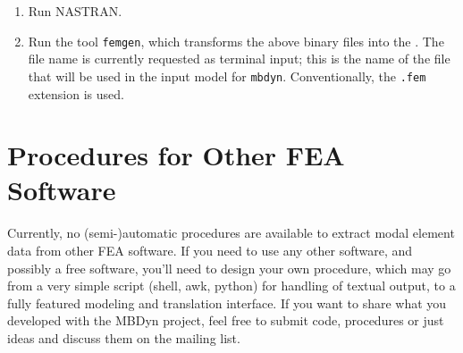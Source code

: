 \begin{enumerate}
\item Run NASTRAN.


\item Run the tool \texttt{femgen}, which transforms the above binary files
into the .
The file name is currently requested as terminal input; this is the name 
of the file that will be used in the input model for \texttt{mbdyn}.
Conventionally, the \texttt{.fem} extension is used.

\end{enumerate} %



\section{Procedures for Other FEA Software}
Currently, no (semi-)automatic procedures are available to extract modal
element data from other FEA software.
If you need to use any other software, and possibly a free software,
you'll need to design your own procedure, which may go from a very simple
script (shell, awk, python) for handling of textual output, to a fully
featured modeling and translation interface.
If you want to share what you developed with the MBDyn project, feel free
to submit code, procedures or just ideas and discuss them on the
mailing list.


